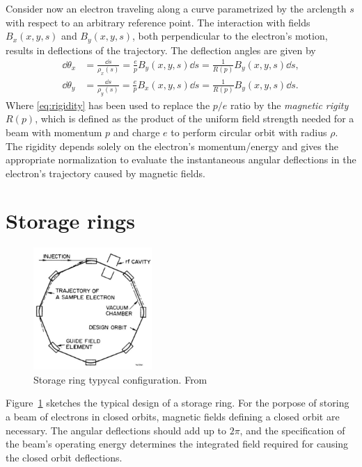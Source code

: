 Consider now an electron traveling along a curve parametrized by the arclength $s$ with respect to an arbitrary reference point. The interaction with fields $B_x(x,y,s)$  and $B_y(x,y,s)$, both perpendicular to the electron's motion, results in deflections of the trajectory. The deflection angles are given by
    \begin{equation}
        \begin{aligned}
            \dd{\theta_x} & = \frac{\dd{s}}{\rho_x(s)} = \frac{e}{p}B_y(x,y,s)\dd s = \frac{1}{R(p)}B_y(x,y,s)\dd s,\\
            \dd{\theta_y} & = \frac{\dd{s}}{\rho_y(s)} = \frac{e}{p}B_x(x,y,s)\dd s = \frac{1}{R(p)}B_y(x,y,s)\dd s.
        \end{aligned}
        \label{eq:deflec_angles}
    \end{equation}
Where \eqref{eq:rigidity} has been used to replace the $p/e$ ratio by the \textit{magnetic rigity} $R(p)$, which is defined as the product of the uniform field strength needed for a beam with momentum $p$ and charge $e$ to perform circular orbit with radius $\rho$. The rigidity depends solely on the electron's momentum/energy and gives the appropriate normalization to evaluate the instantaneous angular deflections in the electron's trajectory caused by magnetic fields.


\section{Storage rings}
\begin{figure}[htb]
    \centering
    \includegraphics[width=0.4\textwidth]{Images/storage_ring.png}
    \caption{Storage ring typycal configuration. From \cite{sands}}
    \label{fig:storage_ring}
\end{figure}
Figure~\ref{fig:storage_ring} sketches the typical design of a storage ring. For the porpose of storing a beam of electrons in closed orbits, magnetic fields defining a closed orbit are necessary. The angular deflections should add up to $2\pi$, and the specification of the beam's operating energy determines the integrated field required for causing the closed orbit deflections.

